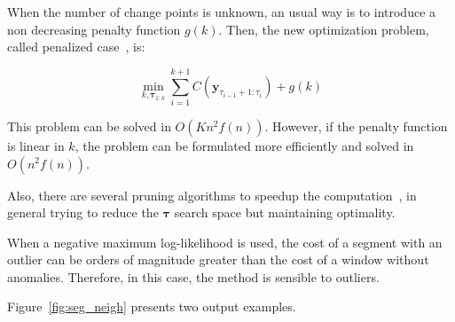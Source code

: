 When the number of change points is unknown, an usual way is to introduce a non
decreasing penalty function $g(k)$. Then, the new optimization problem, called
penalized case~\cite{on_optimal_multiple_changepoint_algorithms_for_large_data},
is:

\begin{equation}
    \min_{k, \boldsymbol \tau_{1 : k}} \sum \limits_{i = 1}^{k + 1} C(\mathbf{y}_{\tau_{i - 1} + 1 : \tau_{i}}) + g(k)
\end{equation}

This problem can be solved in $O(K n^{2} f(n))$. However, if the penalty
function is linear in $k$, the problem can be formulated more efficiently and
solved in $O(n^{2} f(n))$.

Also, there are several pruning algorithms to speedup the
computation~\cite{optimal_detection_of_changepoints_with_a_linear_computational_cost, on_optimal_multiple_changepoint_algorithms_for_large_data, computationally_efficient_changepoint_detection_for_a_range_of_penalties},
in general trying to reduce the $\boldsymbol \tau$ search space but maintaining
optimality.

When a negative maximum log-likelihood is
used, the cost of a segment with an outlier can be orders of magnitude greater
than the cost of a window without anomalies. Therefore,
in this case, the method is sensible to outliers.

Figure~\ref{fig:seg_neigh} presents two output examples.

